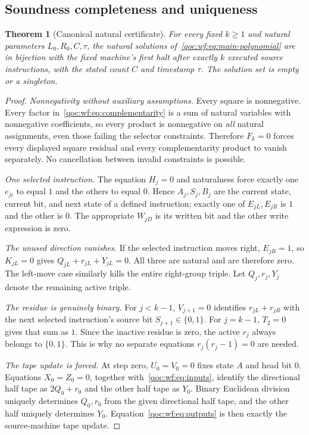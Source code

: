 \documentclass[11pt,letterpaper]{article}
\newtheorem{theorem}{Theorem}[section]
\theoremstyle{definition}
\theoremstyle{remark}
\begin{document}
\subsection{Soundness completeness and uniqueness}
\begin{theorem}[Canonical natural certificate]\label{qoc:wf:thm:certificate}
For every fixed $k\ge1$ and natural parameters $L_0,R_0,C,\tau$, the natural solutions of~\eqref{qoc:wf:eq:main-polynomial} are in bijection with the fixed machine's first halt after exactly $k$ executed source instructions, with the stated count $C$ and timestamp $\tau$. The solution set is empty or a singleton.
\end{theorem}
\begin{proof}
\emph{Nonnegativity without auxiliary assumptions.}
Every square is nonnegative. Every factor in~\eqref{qoc:wf:eq:complementarity} is a sum of natural variables with nonnegative coefficients, so every product is nonnegative on \emph{all} natural assignments, even those failing the selector constraints. Therefore $F_k=0$ forces every displayed square residual and every complementarity product to vanish separately. No cancellation between invalid constraints is possible.

\emph{One selected instruction.}
The equation $H_j=0$ and naturalness force exactly one $e_{ji}$ to equal $1$ and the others to equal $0$. Hence $A_j,S_j,B_j$ are the current state, current bit, and next state of a defined instruction; exactly one of $E_{jL},E_{jR}$ is $1$ and the other is $0$. The appropriate $W_{jD}$ is its written bit and the other write expression is zero.

\emph{The unused direction vanishes.}
If the selected instruction moves right, $E_{jR}=1$, so $K_{jL}=0$ gives $Q_{jL}+r_{jL}+Y_{jL}=0$. All three are natural and are therefore zero. The left-move case similarly kills the entire right-group triple. Let $Q_j,r_j,Y_j$ denote the remaining active triple.

\emph{The residue is genuinely binary.}
For $j<k-1$, $V_{j+1}=0$ identifies $r_{jL}+r_{jR}$ with the next selected instruction's source bit $S_{j+1}\in\{0,1\}$. For $j=k-1$, $T_2=0$ gives that sum as $1$. Since the inactive residue is zero, the active $r_j$ always belongs to $\{0,1\}$. This is why no separate equations $r_j(r_j-1)=0$ are needed.

\emph{The tape update is forced.}
At step zero, $U_0=V_0=0$ fixes state $A$ and head bit $0$. Equations $X_0=Z_0=0$, together with~\eqref{qoc:wf:eq:inputs}, identify the directional half tape as $2Q_0+r_0$ and the other half tape as $Y_0$. Binary Euclidean division uniquely determines $Q_0,r_0$ from the given directional half tape, and the other half uniquely determines $Y_0$. Equation~\eqref{qoc:wf:eq:outputs} is then exactly the source-machine tape update.


\end{proof}
\end{document}
